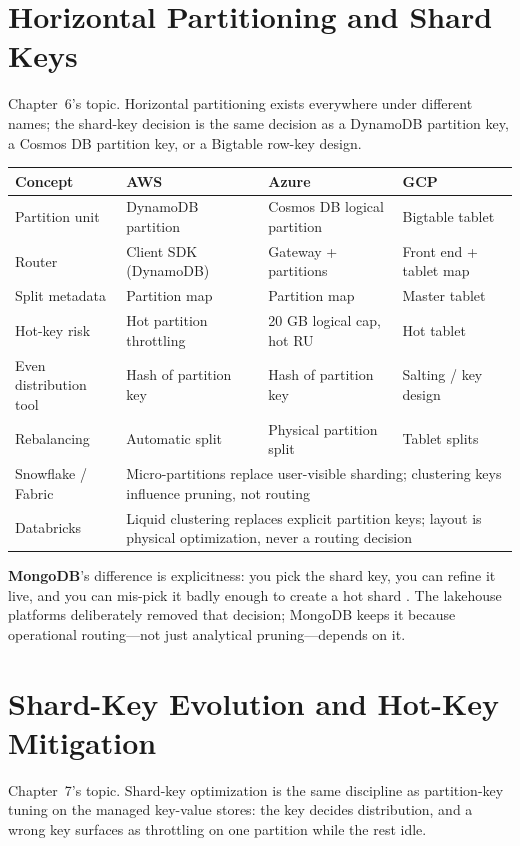 \section{Horizontal Partitioning and Shard Keys}
%
Chapter~6's topic. Horizontal partitioning exists everywhere under different names; the shard-key
decision is the same decision as a DynamoDB partition key, a Cosmos DB partition key, or a Bigtable
row-key design.

\begin{center}
\footnotesize
\begin{tabular}{@{}p{2.9cm}p{3.0cm}p{3.0cm}p{3.0cm}@{}}
\toprule
\textbf{Concept} & \textbf{AWS} & \textbf{Azure} & \textbf{GCP} \\
\midrule
Partition unit & DynamoDB partition & Cosmos DB logical partition & Bigtable tablet \\
Router & Client SDK (DynamoDB) & Gateway + partitions & Front end + tablet map \\
Split metadata & Partition map & Partition map & Master tablet \\
Hot-key risk & Hot partition throttling & 20 GB logical cap, hot RU & Hot tablet \\
Even distribution tool & Hash of partition key & Hash of partition key & Salting / key design \\
Rebalancing & Automatic split & Physical partition split & Tablet splits \\
\addlinespace
Snowflake / Fabric & \multicolumn{3}{l}{Micro-partitions replace user-visible sharding; clustering keys influence pruning, not routing} \\
Databricks & \multicolumn{3}{l}{Liquid clustering replaces explicit partition keys; layout is physical optimization, never a routing decision} \\
\bottomrule
\end{tabular}
\end{center}

\noindent \textbf{MongoDB}'s difference is explicitness: you pick the shard key, you can refine it
live, and you can mis-pick it badly enough to create a hot shard \cite{mongodbShardingDocs}. The
lakehouse platforms deliberately removed that decision; MongoDB keeps it because operational
routing---not just analytical pruning---depends on it.

\section{Shard-Key Evolution and Hot-Key Mitigation}
%
Chapter~7's topic. Shard-key optimization is the same discipline as partition-key tuning on the
managed key-value stores: the key decides distribution, and a wrong key surfaces as throttling on
one partition while the rest idle.

